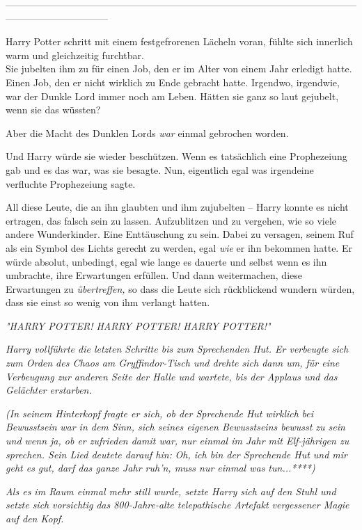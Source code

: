 {--------------------------------------------------------------------------------------------------------------------------------------------

\hfill\break Harry Potter schritt mit einem festgefrorenen Lächeln voran, fühlte sich innerlich warm und gleichzeitig furchtbar.\\ Sie jubelten ihm zu für einen Job, den er im Alter von einem Jahr erledigt hatte. Einen Job, den er nicht wirklich zu Ende gebracht hatte. Irgendwo, irgendwie, war der Dunkle Lord immer noch am Leben. Hätten sie ganz so laut gejubelt, wenn sie das wüssten?

Aber die Macht des Dunklen Lords \emph{war} einmal gebrochen worden.

Und Harry würde sie wieder beschützen. Wenn es tatsächlich eine Prophezeiung gab und es das war, was sie besagte. Nun, eigentlich egal was irgendeine verfluchte Prophezeiung sagte.

All diese Leute, die an ihn glaubten und ihm zujubelten -- Harry konnte es nicht ertragen, das falsch sein zu lassen. Aufzublitzen und zu vergehen, wie so viele andere Wunderkinder. Eine Enttäuschung zu sein. Dabei zu versagen, seinem Ruf als ein Symbol des Lichts gerecht zu werden, egal \emph{wie} er ihn bekommen hatte. Er würde absolut, unbedingt, egal wie lange es dauerte und selbst wenn es ihn umbrachte, ihre Erwartungen erfüllen. Und dann weitermachen, diese Erwartungen zu \emph{übertreffen,} so dass die Leute sich rückblickend wundern würden, dass sie einst so wenig von ihm verlangt hatten.

\emph{"HARRY POTTER! HARRY POTTER! HARRY POTTER!"}

\emph{Harry vollführte die letzten Schritte bis zum Sprechenden Hut. Er verbeugte sich zum Orden des Chaos am Gryffindor-Tisch und drehte sich dann um, für eine Verbeugung zur anderen Seite der Halle und wartete, bis der Applaus und das Gelächter erstarben.}

\emph{(In seinem Hinterkopf fragte er sich, ob der Sprechende Hut wirklich} \emph{\emph{bei Bewusstsein}} \emph{war in dem Sinn, sich seines eigenen Bewusstseins bewusst zu sein und wenn ja, ob er zufrieden damit war, nur einmal im Jahr mit Elf-jährigen zu sprechen. Sein Lied deutete darauf hin:} \emph{\emph{Oh, ich bin der Sprechende Hut und mir geht es gut, darf das ganze Jahr ruh'n, muss nur einmal was tun...}****)}

\emph{Als es im Raum einmal mehr still wurde, setzte Harry sich auf den Stuhl und setzte sich} \emph{\emph{vorsichtig}} \emph{das 800-Jahre-alte telepathische Artefakt vergessener Magie auf den Kopf.}

}
